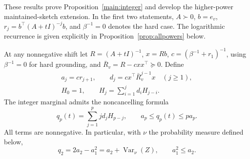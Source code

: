 These results prove Proposition~\ref{main:integer} and develop
the higher-power maintained-sketch extension. In the first two
statements, $A\succ0$, $b=e_v$, $r_j=b^\top(A+tI)^{-j}b$, and
$\beta^{-1}=0$ denotes the hard case. The logarithmic recurrence
is given explicitly in Proposition~\ref{prop:allpowers} below.
\begin{proposition}\label{prop:integerpositive}
At any nonnegative shift let $R=(A+tI)^{-1}$, $x=Rb$,
$c=(\beta^{-1}+r_1)^{-1}$, using $\beta^{-1}=0$ for hard grounding,
and $\bar R_v=R-cxx^\top\succeq0$. Define
\begin{gather*}
 a_j=cr_{j+1},\qquad d_j=cx^\top \bar R_v^{j-1}x\quad(j\geq1),\\
 H_0=1,\qquad H_j=\sum_{i=1}^j d_i H_{j-i}.
\end{gather*}
The integer marginal admits the noncancelling formula
\begin{equation}\label{eq:integerpositive}
 q_p(t)=\sum_{j=1}^p j d_j H_{p-j},\qquad
 a_p\leq q_p(t)\leq p a_p.
\end{equation}
All terms are nonnegative. In particular, with $\nu$ the probability
measure defined below,
\begin{equation}\label{eq:q2variance}
 q_2=2a_2-a_1^2=a_2+\operatorname{Var}_{\nu}(Z),
 \qquad a_1^2\leq a_2.
\end{equation}
\end{proposition}
